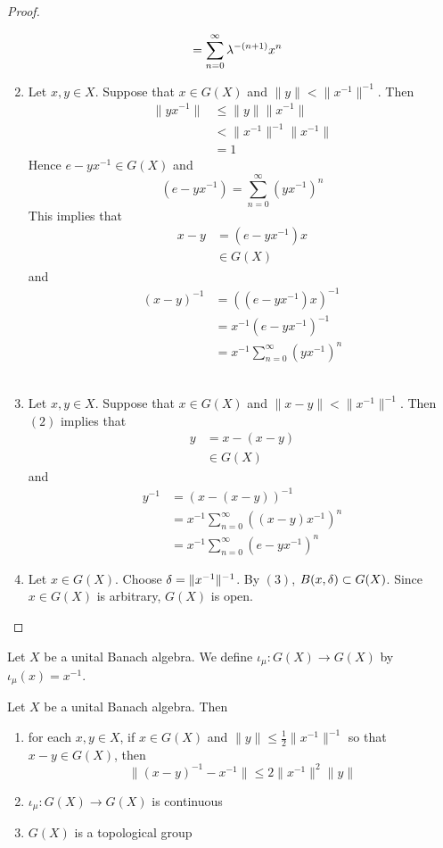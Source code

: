 \documentclass{book}
\begin{document}
\begin{proof}
\begin{enumerate}
\begin{align*}
			& = \sum_{n=0}^{\infty} \lambda^{-(n+1)} x^n 
		\end{align*}
		\item  Let $x, y \in X$. Suppose that $x \in G(X)$ and $\|y \|< \|x^{-1} \|^{-1}$. Then 
		\begin{align*}
			\|yx^{-1} \|
			& \leq \|y\| \|x^{-1} \| \\
			& <  \|x^{-1} \|^{-1} \|x^{-1} \| \\
			& = 1
		\end{align*}
		Hence $e - yx^{-1} \in G(X)$ and
		$$(e - yx^{-1}) = \sum_{n=0}^{\infty} (y x^{-1})^n$$
		This implies that 
		\begin{align*}
			x - y
			& = (e - yx^{-1}) x \\
			& \in G(X)
		\end{align*}
		and 
		\begin{align*}
			(x - y)^{-1}
			& = ((e - yx^{-1}) x)^{-1} \\
			& = x^{-1} (e - yx^{-1})^{-1} \\
			& = x^{-1} \sum_{n=0}^{\infty} (y x^{-1})^n
		\end{align*}
		\vspace{.5cm}\\
		\item Let $x, y \in X$. Suppose that $x \in G(X)$ and $\|x-y \|< \|x^{-1} \|^{-1}$. Then $(2)$ implies that 
		\begin{align*}
			y 
			& = x - (x -y) \\
			& \in G(X)
		\end{align*}
		and 
		\begin{align*}
			y^{-1} 
			& = (x - (x -y))^{-1} \\
			& = x^{-1} \sum_{n=0}^{\infty} ((x - y) x^{-1})^n \\
			& = x^{-1} \sum_{n=0}^{\infty} (e - y x^{-1})^n
		\end{align*}
		\item Let $x \in G(X)$. Choose $\delta = \|x^{-1}\|^{-1}$. By $(3)$, $B(x, \delta) \subset G(X)$. Since $x \in G(X)$ is arbitrary, $G(X)$ is open. 
	\end{enumerate}
\end{proof}	

\begin{defn}
	Let $X$ be a unital Banach algebra. We define $\iota_{\mu}: G(X) \rightarrow G(X)$ by $\iota_{\mu}(x) = x^{-1}$. 
\end{defn}

\begin{ex}
	Let $X$ be a unital Banach algebra. Then
	\begin{enumerate}
		\item for each $x,y \in X$, if $x \in G(X)$ and $\|y\| \leq \frac{1}{2} \|x^{-1}\|^{-1}$ so that $x - y \in G(X)$, then  
		$$\|(x-y)^{-1} - x^{-1}\| \leq 2 \|x^{-1}\|^2 \|y\|$$
		\item $\iota_{\mu}: G(X) \rightarrow G(X)$ is continuous
		\item $G(X)$ is a topological group
	\end{enumerate}
\end{ex}
\end{document}
